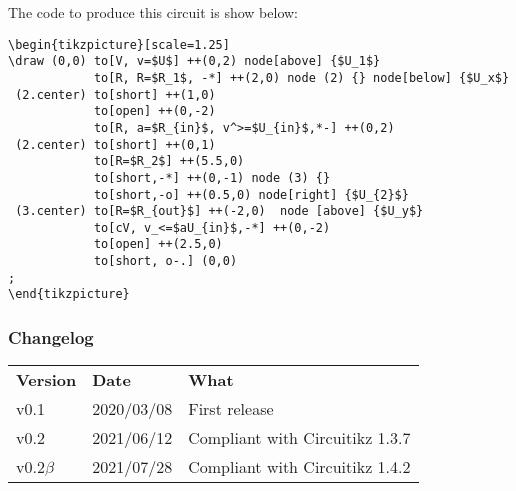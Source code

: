 \documentclass[12pt]{article}
\begin{document}
The code to produce this circuit is show below:

\begin{lstlisting}
\begin{tikzpicture}[scale=1.25]
\draw (0,0) to[V, v=$U$] ++(0,2) node[above] {$U_1$}
            to[R, R=$R_1$, -*] ++(2,0) node (2) {} node[below] {$U_x$}
 (2.center) to[short] ++(1,0)
            to[open] ++(0,-2)
            to[R, a=$R_{in}$, v^>=$U_{in}$,*-] ++(0,2) 
 (2.center) to[short] ++(0,1)
            to[R=$R_2$] ++(5.5,0)
            to[short,-*] ++(0,-1) node (3) {}
			to[short,-o] ++(0.5,0) node[right] {$U_{2}$}
 (3.center) to[R=$R_{out}$] ++(-2,0)  node [above] {$U_y$}
            to[cV, v_<=$aU_{in}$,-*] ++(0,-2)
			to[open] ++(2.5,0)
            to[short, o-.] (0,0)
;
\end{tikzpicture}
\end{lstlisting}
\subsubsection*{Changelog}

\begin{table}[!ht]
\begin{tabular}{lll}
\textbf{Version} & \textbf{Date} & \textbf{What} \\
v0.1    & 2020/03/08 & First release\\
v0.2    & 2021/06/12 & Compliant with Circuitikz 1.3.7\\
v0.2$\beta$  & 2021/07/28 & Compliant with Circuitikz 1.4.2
\end{tabular}
\end{table}
\end{document}
